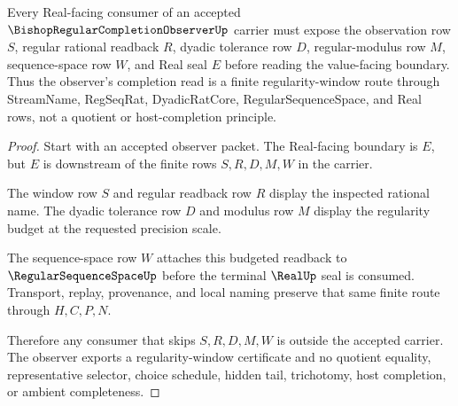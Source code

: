 \begin{theorem}
\label{thm:bishop-regular-completion-observer-regularity-window}
Every Real-facing consumer of an accepted $\BishopRegularCompletionObserverUp$ carrier must expose the observation row $S$, regular rational readback $R$, dyadic tolerance row $D$, regular-modulus row $M$, sequence-space row $W$, and Real seal $E$ before reading the value-facing boundary. Thus the observer's completion read is a finite regularity-window route through StreamName, RegSeqRat, DyadicRatCore, RegularSequenceSpace, and Real rows, not a quotient or host-completion principle.
\end{theorem}
\begin{proof}
Start with an accepted observer packet. The Real-facing boundary is $E$, but $E$ is downstream of the finite rows $S,R,D,M,W$ in the carrier.

The window row $S$ and regular readback row $R$ display the inspected rational name. The dyadic tolerance row $D$ and modulus row $M$ display the regularity budget at the requested precision scale.

The sequence-space row $W$ attaches this budgeted readback to $\RegularSequenceSpaceUp$ before the terminal $\RealUp$ seal is consumed. Transport, replay, provenance, and local naming preserve that same finite route through $H,C,P,N$.

Therefore any consumer that skips $S,R,D,M,W$ is outside the accepted carrier. The observer exports a regularity-window certificate and no quotient equality, representative selector, choice schedule, hidden tail, trichotomy, host completion, or ambient completeness.
\end{proof}




